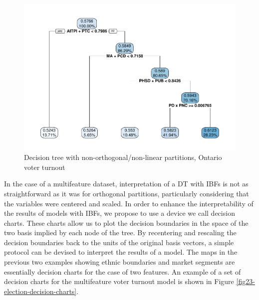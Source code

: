 \documentclass[]{elsarticle} %
\makeatletter
\def\maxwidth{\ifdim\Gin@nat@width>\linewidth\linewidth
\else\Gin@nat@width\fi}
\let\Oldincludegraphics\includegraphics
\renewcommand{\includegraphics}[1]{\Oldincludegraphics[width=\maxwidth]{#1}}
\makeatother
\begin{document}
\begin{figure}[htbp]
\centering
\includegraphics{Trees_with_Base_Functions_files/figure-latex/fig22-tree-basis-election-1.pdf}
\caption{\label{fig:fig22-tree-basis-election}Decision tree with
non-orthogonal/non-linear partitions, Ontario voter turnout}
\end{figure}

In the case of a multifeature dataset, interpretation of a DT with IBFs
is not as straightforward as it was for orthogonal partitions,
particularly considering that the variables were centered and scaled. In
order to enhance the interpretability of the results of models with
IBFs, we propose to use a device we call decision charts. These charts
allow us to plot the decision boundaries in the space of the two basis
implied by each node of the tree. By recentering and rescaling the
decision boundaries back to the units of the original basis vectors, a
simple protocol can be devised to interpret the results of a model. The
maps in the previous two examples showing ethnic boundaries and market
segments are essentially decision charts for the case of two features.
An example of a set of decision charts for the multifeature voter
turnout model is shown in Figure \ref{fig23-election-decision-charts}.
\end{document}
